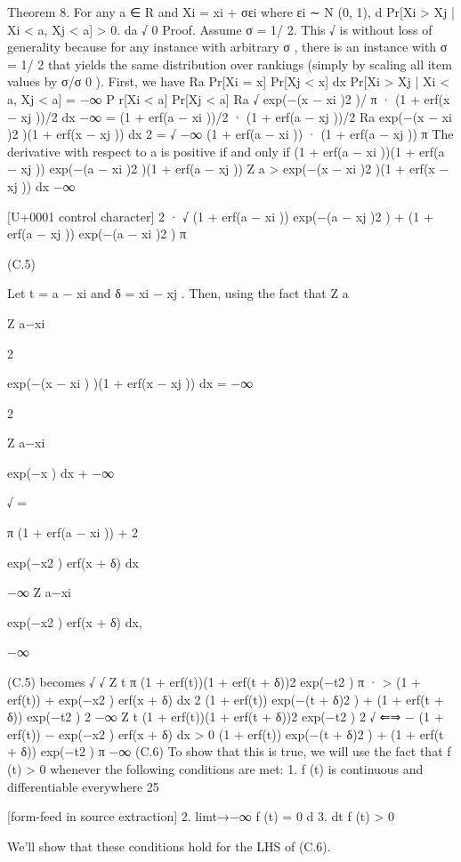 \documentclass[10pt]{article}
\begin{document}
\begin{ReviewVerbatim}
Theorem 8. For any a ∈ R and Xi = xi + σεi where εi ∼ N (0, 1),
d
Pr[Xi > Xj | Xi < a, Xj < a] > 0.
da
√
0
Proof. Assume σ = 1/ 2. This
√ is without loss of generality because for any instance with arbitrary σ , there
is an instance with σ = 1/ 2 that yields the same distribution over rankings (simply by scaling all item
values by σ/σ 0 ). First, we have
Ra
Pr[Xi = x] Pr[Xj < x] dx
Pr[Xi > Xj | Xi < a, Xj < a] = −∞
P r[Xi < a] Pr[Xj < a]
Ra
√
exp(−(x − xi )2 )/ π · (1 + erf(x − xj ))/2 dx
−∞
=
(1 + erf(a − xi ))/2 · (1 + erf(a − xj ))/2
Ra
exp(−(x − xi )2 )(1 + erf(x − xj )) dx
2
= √ −∞
(1 + erf(a − xi )) · (1 + erf(a − xj ))
π
The derivative with respect to a is positive if and only if
(1 + erf(a − xi ))(1 + erf(a − xj )) exp(−(a − xi )2 )(1 + erf(a − xj ))
Z a
>
exp(−(x − xi )2 )(1 + erf(x − xj )) dx
−∞

[U+0001 control character]
2
· √ (1 + erf(a − xi )) exp(−(a − xj )2 ) + (1 + erf(a − xj )) exp(−(a − xi )2 )
π

(C.5)

Let t = a − xi and δ = xi − xj . Then, using the fact that
Z a

Z a−xi

2

exp(−(x − xi ) )(1 + erf(x − xj )) dx =
−∞

2

Z a−xi

exp(−x ) dx +
−∞

√
=

π
(1 + erf(a − xi )) +
2

exp(−x2 ) erf(x + δ) dx

−∞
Z a−xi

exp(−x2 ) erf(x + δ) dx,

−∞

(C.5) becomes
√
√
Z t
π
(1 + erf(t))(1 + erf(t + δ))2 exp(−t2 )
π
·
>
(1
+
erf(t))
+
exp(−x2 ) erf(x + δ) dx
2 (1 + erf(t)) exp(−(t + δ)2 ) + (1 + erf(t + δ)) exp(−t2 )
2
−∞
Z t
(1 + erf(t))(1 + erf(t + δ))2 exp(−t2 )
2
√
⇐⇒
−
(1
+
erf(t))
−
exp(−x2 ) erf(x + δ) dx > 0
(1 + erf(t)) exp(−(t + δ)2 ) + (1 + erf(t + δ)) exp(−t2 )
π −∞
(C.6)
To show that this is true, we will use the fact that f (t) > 0 whenever the following conditions are met:
1. f (t) is continuous and differentiable everywhere
25


[form-feed in source extraction]
2. limt→−∞ f (t) = 0
d
3. dt
f (t) > 0

We’ll show that these conditions hold for the LHS of (C.6).


\end{ReviewVerbatim}
\end{document}
